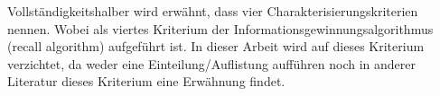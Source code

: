 
Vollständigkeitshalber wird erwähnt, dass \citet{characterisation_4} vier Charakterisierungskriterien nennen. Wobei als viertes Kriterium der Informationsgewinnungsalgorithmus (recall algorithm) aufgeführt ist. In dieser Arbeit wird auf dieses Kriterium verzichtet, da weder \citet{characterisation_4} eine Einteilung/Auflistung aufführen noch in anderer Literatur dieses Kriterium eine Erwähnung findet.\\




